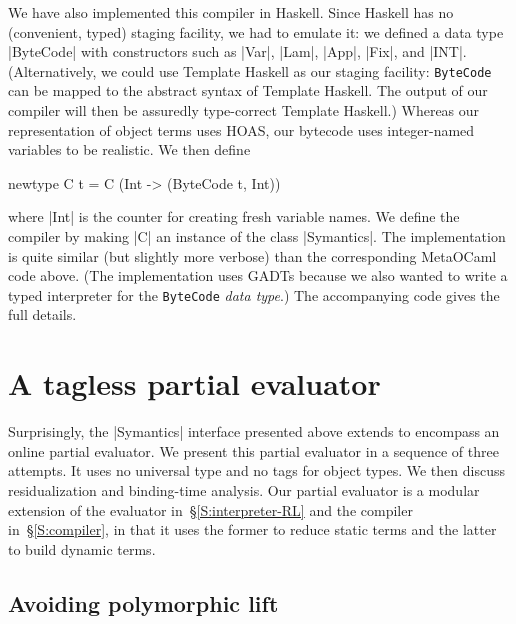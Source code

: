We have also implemented this compiler in Haskell. 
Since Haskell
has no (convenient, typed) staging facility, we had to emulate
it: we defined a data type |ByteCode| with
constructors such as |Var|, |Lam|, |App|, |Fix|, and |INT|.
(Alternatively, we could use Template Haskell as our staging facility:
\texttt{ByteCode} can be mapped to the abstract syntax of Template
Haskell. The output of our compiler will then be assuredly type-correct
Template Haskell.)
Whereas our representation of object terms uses HOAS,
our bytecode uses integer-named
variables to be realistic. 
We then define 
\begin{code}
newtype C t = C (Int -> (ByteCode t, Int)) 
\end{code}
where |Int| is the counter for creating fresh variable
names. We define the compiler by making |C| an instance of the
class |Symantics|.
The implementation is quite similar (but slightly more
verbose) than the corresponding MetaOCaml code above. (The implementation uses
GADTs because we also wanted to write a typed interpreter for 
the \texttt{ByteCode} \emph{data type}.) The
accompanying code gives the full details.
\fi

\ifshort

\else

\section{A tagless partial evaluator}\label{PE}
Surprisingly, the |Symantics| interface presented above extends to
encompass an online partial evaluator.  We present this partial evaluator
in a sequence of three attempts. It uses no universal type and no tags
for object types.  We then discuss residualization and binding-time
analysis.  Our partial evaluator is a modular extension of the evaluator
in~\S\ref{S:interpreter-RL} and the compiler in~\S\ref{S:compiler}, in
that it uses the former to reduce static terms and the latter to build
dynamic terms.

\subsection{Avoiding polymorphic lift}
\label{S:PE-lift}

